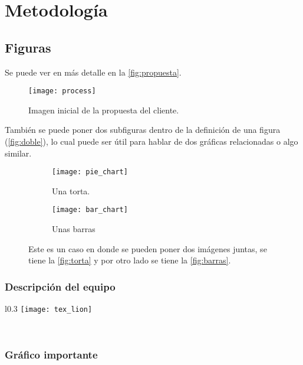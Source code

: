 \section{Metodología}
\subsection{Figuras}
\lipsum[10] Se puede ver en más detalle en la \autoref{fig:propuesta}.

\begin{figure}[h]
	\centering
	\texttt{[image: process]}
	\caption{Imagen inicial de la propuesta del cliente.}
	\label{fig:propuesta}
\end{figure}

También se puede poner dos subfiguras dentro de la definición de una figura (\autoref{fig:doble}), lo cual puede ser útil para hablar de dos gráficas relacionadas o algo similar. 

\begin{figure}[h!]
	\centering
	\begin{subfigure}{.45\textwidth}
		\centering
		\texttt{[image: pie\_chart]}%
		\caption{Una torta.}
		\label{fig:torta}
	\end{subfigure} 
	\hfil
	\begin{subfigure}{.45\textwidth}
		\centering
		\texttt{[image: bar\_chart]}%
		\caption{Unas barras}
		\label{fig:barras}
	\end{subfigure}
	\caption{Este es un caso en donde se pueden poner dos imágenes juntas, se tiene la \autoref{fig:torta} y por otro lado se tiene la \autoref{fig:barras}.}
	\label{fig:doble}
\end{figure}

\lipsum[11]

\subsubsection{Descripción del equipo}

\begin{wrapfigure}[9]{l}{0.3\linewidth}
	\vspace{-17pt}
	\texttt{[image: tex\_lion]}
\end{wrapfigure}
\noindent {\large \textbf{\textcolor{blue}{El león de \TeX}}}\\ [5pt]
\lipsum[1]

\subsubsection{Gráfico importante}

